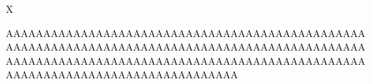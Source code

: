 \documentclass{article}
\begin{document}
X

\newpage

AAAAAAAAAAAAAAAAAAAAAAAAAAAAAAAAAAAAAAAAAAAAAAAAAAAAAAAAAAAAAAAAAAAAAAAAAAAAAAAAAAAAAAAAAAAAAAAAAAAAAAAAAAAAAAAAAAAAAAAAAAAAAAAAAAAAAAAAAAAAAAAAAAAAAAAAAAAAAAAAAAAAAAAAAAAAAAA
\end{document}
